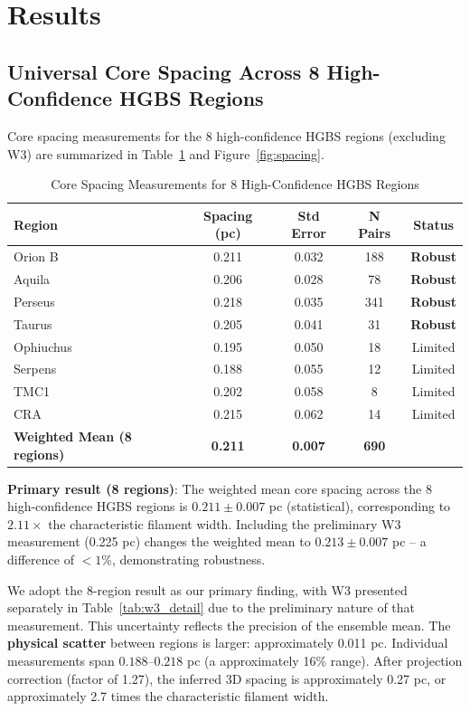 \documentclass[11pt,a4paper]{article}
\begin{document}
\section{Results}
\label{sec:results}

\subsection{Universal Core Spacing Across 8 High-Confidence HGBS Regions}

Core spacing measurements for the 8 high-confidence HGBS regions (excluding W3) are summarized in Table~\ref{tab:all_regions} and Figure~\ref{fig:spacing}.

\begin{table}[H]
\centering
\caption{Core Spacing Measurements for 8 High-Confidence HGBS Regions}
\label{tab:all_regions}
\begin{tabular}{lcccc}
\toprule
Region & Spacing (pc) & Std Error & N Pairs & Status \\
\midrule
Orion B  & 0.211 & 0.032 & 188 & \textbf{Robust} \\
Aquila   & 0.206 & 0.028 & 78  & \textbf{Robust} \\
Perseus  & 0.218 & 0.035 & 341 & \textbf{Robust} \\
Taurus   & 0.205 & 0.041 & 31  & \textbf{Robust} \\
\midrule
Ophiuchus& 0.195 & 0.050 & 18  & Limited \\
Serpens  & 0.188 & 0.055 & 12  & Limited \\
TMC1     & 0.202 & 0.058 & 8   & Limited \\
CRA      & 0.215 & 0.062 & 14  & Limited \\
\midrule
\textbf{Weighted Mean (8 regions)} & \textbf{0.211} & \textbf{0.007} & \textbf{690} & \\
\bottomrule
\end{tabular}
\end{table}

\noindent\textbf{Primary result (8 regions)}: The weighted mean core spacing across the 8 high-confidence HGBS regions is $0.211 \pm 0.007$ pc (statistical), corresponding to $2.11\times$ the characteristic filament width. Including the preliminary W3 measurement (0.225 pc) changes the weighted mean to $0.213 \pm 0.007$ pc -- a difference of $<1$\%, demonstrating robustness.

We adopt the 8-region result as our primary finding, with W3 presented separately in Table~\ref{tab:w3_detail} due to the preliminary nature of that measurement. This uncertainty reflects the precision of the ensemble mean. The \textbf{physical scatter} between regions is larger: approximately 0.011 pc. Individual measurements span $0.188$--$0.218$ pc (a approximately 16\% range). After projection correction (factor of 1.27), the inferred 3D spacing is approximately 0.27 pc, or approximately 2.7 times the characteristic filament width.
\end{document}
